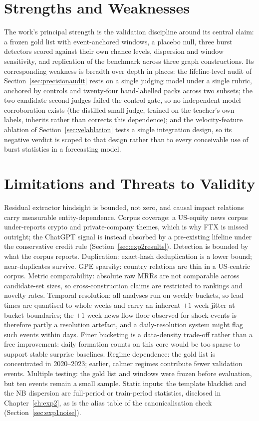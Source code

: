 \documentclass[a4paper,12pt]{report}
\begin{document}
\section{Strengths and Weaknesses}
The work's principal strength is the validation discipline around its central
claim: a frozen gold list with event-anchored windows, a placebo null, three
burst detectors scored against their own chance levels, dispersion and window
sensitivity, and replication of the benchmark across three graph
constructions. Its corresponding weakness is breadth over depth in places:
the lifeline-level audit of Section~\ref{sec:precisionaudit} rests on a
single judging model under a single rubric, anchored by controls and
twenty-four hand-labelled packs across two subsets; the two candidate second
judges failed the control gate, so no independent model corroboration
exists (the distilled small judge, trained on the teacher's own labels,
inherits rather than corrects this dependence); and the
velocity-feature ablation of Section~\ref{sec:velablation} tests a single
integration design, so its negative verdict is scoped to that design rather
than to every conceivable use of burst statistics in a forecasting model.

\section{Limitations and Threats to Validity}
Residual extractor hindsight is bounded, not zero, and causal impact
relations carry measurable entity-dependence. Corpus coverage: a
US-equity news corpus under-reports crypto and private-company themes,
which is why FTX is missed outright; the ChatGPT signal is instead absorbed
by a pre-existing lifeline under the conservative credit rule
(Section~\ref{sec:exp2results}). Detection is bounded by what the corpus reports. Duplication: exact-hash deduplication is a lower
bound; near-duplicates survive. GPE sparsity: country relations are
thin in a US-centric corpus. Metric comparability: absolute raw MRRs
are not comparable across candidate-set sizes, so cross-construction claims
are restricted to rankings and novelty rates. Temporal resolution:
all analyses run on weekly buckets, so lead times are quantised to whole
weeks and carry an inherent $\pm 1$-week jitter at bucket boundaries; the
$+1$-week news-flow floor observed for shock events is therefore partly a
resolution artefact, and a daily-resolution system might flag such events
within days. Finer bucketing is a data-density trade-off rather than a free
improvement: daily formation counts on this core would be too sparse to
support stable surprise baselines. Regime dependence: the
gold list is concentrated in 2020--2023; earlier, calmer regimes contribute
fewer validation events. Multiple testing: the gold list and windows
were frozen before evaluation, but ten events remain a small sample.
Static inputs: the template blacklist and the NB dispersion are
full-period or train-period statistics, disclosed in
Chapter~\ref{ch:exp2}, as is the alias table of the canonicalisation
check (Section~\ref{sec:exp1noise}).
\end{document}
